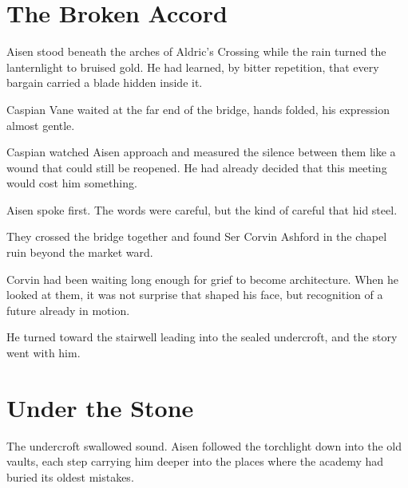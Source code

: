 \documentclass{cwbook}
\begin{document}

\tableofcontents
\clearpage

\chapter{The Broken Accord}


Aisen stood beneath the arches of Aldric's Crossing while the rain turned the lanternlight to bruised gold. He had learned, by bitter repetition, that every bargain carried a blade hidden inside it.

Caspian Vane waited at the far end of the bridge, hands folded, his expression almost gentle.



Caspian watched Aisen approach and measured the silence between them like a wound that could still be reopened. He had already decided that this meeting would cost him something.

Aisen spoke first. The words were careful, but the kind of careful that hid steel.

\SceneBreak

They crossed the bridge together and found Ser Corvin Ashford in the chapel ruin beyond the market ward.



Corvin had been waiting long enough for grief to become architecture. When he looked at them, it was not surprise that shaped his face, but recognition of a future already in motion.

He turned toward the stairwell leading into the sealed undercroft, and the story went with him.

\chapter{Under the Stone}


The undercroft swallowed sound. Aisen followed the torchlight down into the old vaults, each step carrying him deeper into the places where the academy had buried its oldest mistakes.
\end{document}
